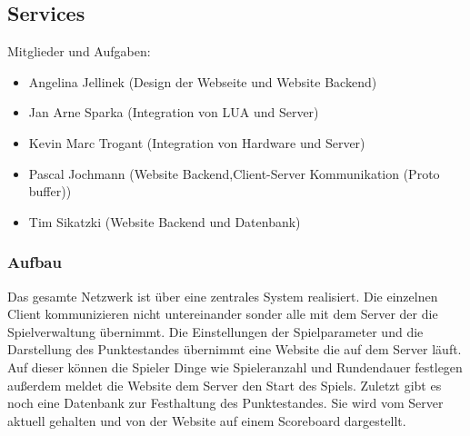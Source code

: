 \subsection{Services}
\label{services}

Mitglieder und Aufgaben:
\begin{itemize}
  \item
    Angelina Jellinek (Design der Webseite und Website Backend)
  \item
    Jan Arne Sparka (Integration von LUA und Server)
  \item
    Kevin Marc Trogant (Integration von Hardware und Server)
  \item
    Pascal Jochmann (Website Backend,Client-Server Kommunikation (Proto buffer))
  \item
    Tim Sikatzki (Website Backend und Datenbank)
\end{itemize}

\subsubsection{Aufbau}
Das gesamte Netzwerk ist über eine zentrales System realisiert. Die einzelnen 
Client kommunizieren nicht untereinander sonder alle mit dem Server der die Spielverwaltung übernimmt. 
Die Einstellungen der Spielparameter und die Darstellung des Punktestandes übernimmt eine Website die auf dem Server läuft. 
Auf dieser können die Spieler Dinge wie Spieleranzahl und Rundendauer festlegen außerdem meldet 
die Website dem Server den Start des Spiels. Zuletzt gibt es noch eine Datenbank zur Festhaltung des Punktestandes. 
Sie wird vom Server aktuell gehalten und von der Website auf einem Scoreboard dargestellt.

